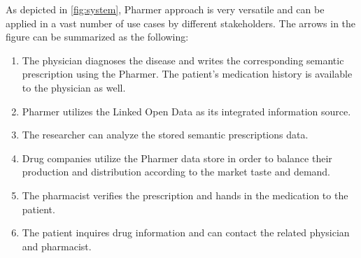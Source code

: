 \documentclass[10pt, conference, compsocconf]{IEEEtran}
\begin{document}
As depicted in \autoref{fig:system}, Pharmer approach is very versatile and can be applied in a vast number of use cases by different stakeholders. The arrows in the figure can be summarized as the following:
\begin{enumerate}
\item The physician diagnoses the disease and writes the corresponding semantic prescription using the Pharmer. The patient's medication history is available to the physician as well.
\item Pharmer utilizes the Linked Open Data as its integrated information source.
\item The researcher can analyze the stored semantic prescriptions data.
\item Drug companies utilize the Pharmer data store in order to balance their production and distribution according to the market taste and demand.
\item The pharmacist verifies the prescription and hands in the medication to the patient.
\item The patient inquires drug information and can contact the related physician and pharmacist.
\end{enumerate}
\end{document}
